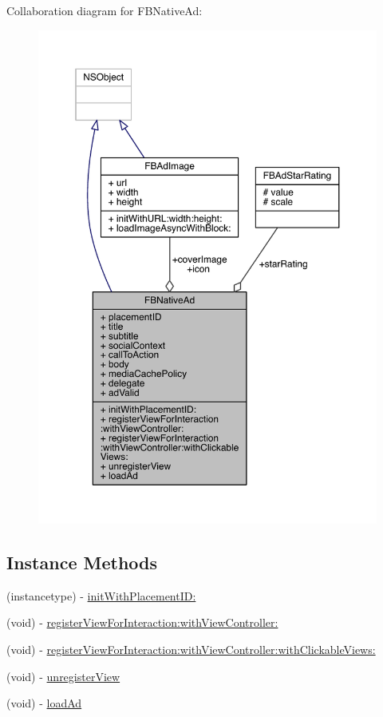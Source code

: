 Collaboration diagram for F\-B\-Native\-Ad\-:
\nopagebreak
\begin{figure}[H]
\begin{center}
\leavevmode
\includegraphics[width=350pt]{interface_f_b_native_ad__coll__graph}
\end{center}
\end{figure}
\subsection*{Instance Methods}
\begin{DoxyCompactItemize}
\item 
(instancetype) -\/ \hyperlink{interface_f_b_native_ad_a111579ea5252366d86f9a1a64ededadd}{init\-With\-Placement\-I\-D\-:}
\item 
(void) -\/ \hyperlink{interface_f_b_native_ad_ac59e70c3b67fdb6f91adfdf05b50b87d}{register\-View\-For\-Interaction\-:with\-View\-Controller\-:}
\item 
(void) -\/ \hyperlink{interface_f_b_native_ad_af00e5e92804248d283e1d9b3b6719125}{register\-View\-For\-Interaction\-:with\-View\-Controller\-:with\-Clickable\-Views\-:}
\item 
(void) -\/ \hyperlink{interface_f_b_native_ad_af146b825ecd435d8e4de489f6b61dcc2}{unregister\-View}
\item 
(void) -\/ \hyperlink{interface_f_b_native_ad_a943433e6b6c4e4a3d3868203642cda15}{load\-Ad}
\end{DoxyCompactItemize}
